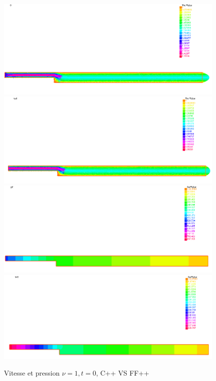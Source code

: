 \documentclass[a4paper,12pt]{article}
\begin{document}
\begin{figure}[!t]
	\caption{Vitesse et pression $\nu = 1,t=0$, C++ VS FF++}
	\centering
	\includegraphics[width=0.49\linewidth]{image/c++_NS_nu=1_t=0_u.png}
	\includegraphics[width=0.49\linewidth]{image/ff++_NS_nu=1_t=0_u.png}
	\includegraphics[width=0.49\linewidth]{image/c++_NS_nu=1_t=0_p.png}
	\includegraphics[width=0.49\linewidth]{image/ff++_NS_nu=1_t=0_p.png}
\end{figure}
\end{document}
